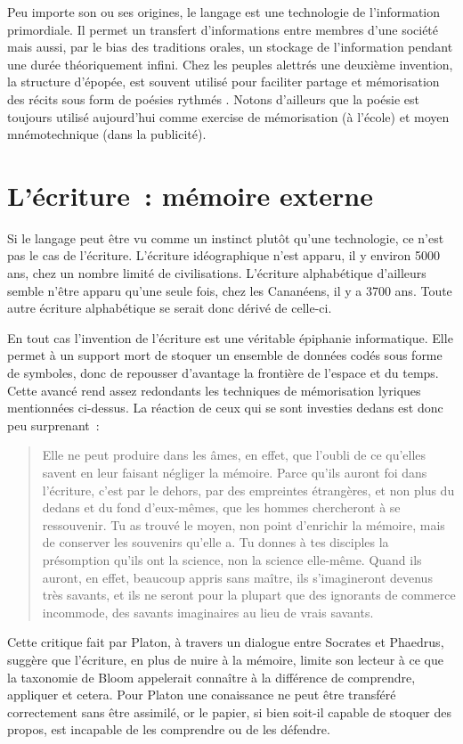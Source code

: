 Peu importe son ou ses origines, le langage est une technologie de l'information primordiale. Il permet un transfert d'informations entre membres d'une société mais aussi, par le bias des traditions orales, un stockage de l'information pendant une durée théoriquement infini. Chez les peuples alettrés une deuxième invention, la structure d'épopée, est souvent utilisé pour faciliter partage et mémorisation des récits sous form de poésies rythmés \cite{havelock-preface-plato}. Notons d'ailleurs que la poésie est toujours utilisé aujourd'hui comme exercise de mémorisation (à l'école) et moyen mnémotechnique (dans la publicité).

\section{L'écriture~: mémoire externe}
Si le langage peut être vu comme un instinct plutôt qu'une technologie, ce n'est pas le cas de l'écriture. L'écriture idéographique n'est apparu, il y environ 5000 ans, chez un nombre limité de civilisations. L'écriture alphabétique d'ailleurs semble n'être apparu qu'une seule fois, chez les Cananéens, il y a 3700 ans\cite{linguistics-pinker}. Toute autre écriture alphabétique se serait donc dérivé de celle-ci.

En tout cas l'invention de l'écriture est une véritable épiphanie informatique. Elle permet à un support mort de stoquer un ensemble de données codés sous forme de symboles, donc de repousser d'avantage la frontière de l'espace et du temps.
Cette avancé rend assez redondants les techniques de mémorisation lyriques mentionnées ci-dessus. La réaction de ceux qui se sont investies dedans est donc peu surprenant~:
\begin{quote}
Elle ne peut produire dans les âmes, en effet, que l’oubli de ce qu’elles  savent en leur faisant négliger la mémoire. Parce qu’ils auront foi dans  l’écriture, c’est par le dehors, par des empreintes étrangères, et non plus du dedans et du fond d’eux-mêmes, que les hommes chercheront à se ressouvenir. Tu as trouvé le moyen, non point d’enrichir la mémoire, mais de conserver les souvenirs qu’elle a. Tu donnes à tes disciples la présomption qu’ils ont la science, non la science elle-même. Quand ils auront, en effet, beaucoup appris sans maître, ils s’imagineront devenus très savants, et ils ne seront pour la plupart que des ignorants de commerce incommode, des savants imaginaires au lieu de vrais savants.
\end{quote}
Cette critique fait par Platon\cite{plato-phaedrus}, à travers un dialogue entre Socrates et Phaedrus, suggère que l'écriture, en plus de nuire à la mémoire, limite son lecteur à ce que la taxonomie de Bloom\cite{tax-bloom} appelerait \og{}connaître\fg{} à la différence de \og{}comprendre\fg{}, \og{}appliquer\fg{} et cetera. Pour Platon une conaissance ne peut être transféré correctement sans être assimilé, or le papier, si bien soit-il capable de stoquer des propos, est incapable de les comprendre ou de les défendre. 

